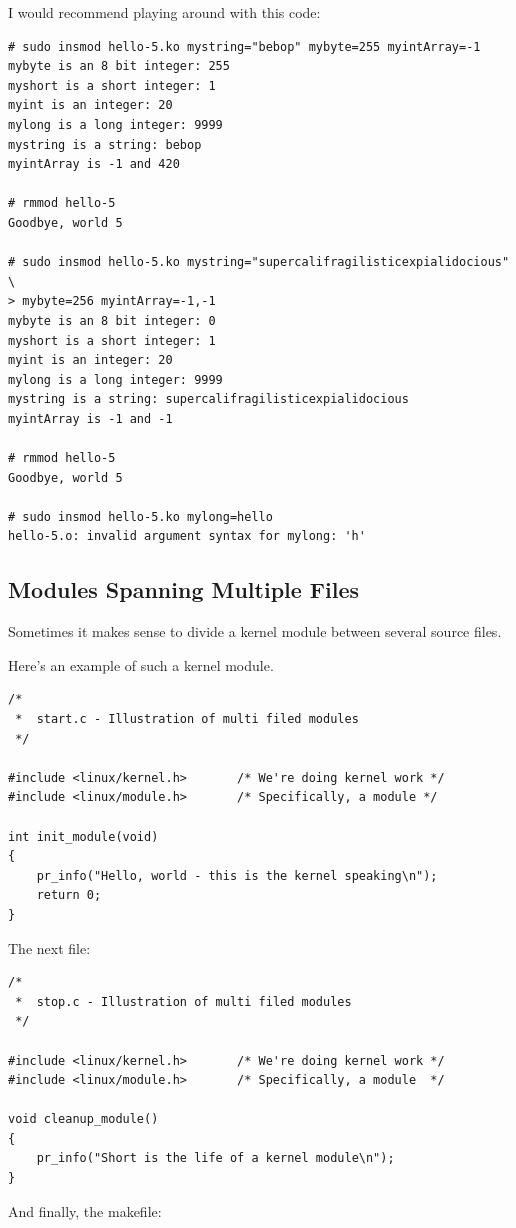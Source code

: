 \documentclass[11pt]{article}
\begin{document}
I would recommend playing around with this code:

\begin{verbatim}
# sudo insmod hello-5.ko mystring="bebop" mybyte=255 myintArray=-1
mybyte is an 8 bit integer: 255
myshort is a short integer: 1
myint is an integer: 20
mylong is a long integer: 9999
mystring is a string: bebop
myintArray is -1 and 420

# rmmod hello-5
Goodbye, world 5

# sudo insmod hello-5.ko mystring="supercalifragilisticexpialidocious" \
> mybyte=256 myintArray=-1,-1
mybyte is an 8 bit integer: 0
myshort is a short integer: 1
myint is an integer: 20
mylong is a long integer: 9999
mystring is a string: supercalifragilisticexpialidocious
myintArray is -1 and -1

# rmmod hello-5
Goodbye, world 5

# sudo insmod hello-5.ko mylong=hello
hello-5.o: invalid argument syntax for mylong: 'h'
\end{verbatim}

\subsection*{Modules Spanning Multiple Files}
\label{sec-4-6}
Sometimes it makes sense to divide a kernel module between several source files.

Here's an example of such a kernel module.

\begin{verbatim}
/*
 *  start.c - Illustration of multi filed modules
 */

#include <linux/kernel.h>       /* We're doing kernel work */
#include <linux/module.h>       /* Specifically, a module */

int init_module(void)
{
    pr_info("Hello, world - this is the kernel speaking\n");
    return 0;
}
\end{verbatim}

The next file:

\begin{verbatim}
/*
 *  stop.c - Illustration of multi filed modules
 */

#include <linux/kernel.h>       /* We're doing kernel work */
#include <linux/module.h>       /* Specifically, a module  */

void cleanup_module()
{
    pr_info("Short is the life of a kernel module\n");
}
\end{verbatim}

And finally, the makefile:
\end{document}
